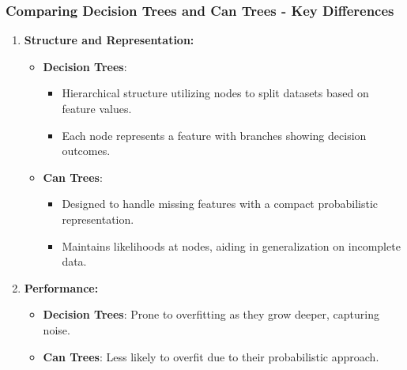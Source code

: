 \documentclass[aspectratio=169]{beamer}
\begin{document}
\begin{frame}[fragile]
    \frametitle{Comparing Decision Trees and Can Trees - Key Differences}
   
    \begin{enumerate}
        \item \textbf{Structure and Representation:}
            \begin{itemize}
                \item \textbf{Decision Trees}:
                    \begin{itemize}
                        \item Hierarchical structure utilizing nodes to split datasets based on feature values.
                        \item Each node represents a feature with branches showing decision outcomes.
                    \end{itemize}
                \item \textbf{Can Trees}:
                    \begin{itemize}
                        \item Designed to handle missing features with a compact probabilistic representation.
                        \item Maintains likelihoods at nodes, aiding in generalization on incomplete data.
                    \end{itemize}
            \end{itemize}
        \item \textbf{Performance:}
            \begin{itemize}
                \item \textbf{Decision Trees}: Prone to overfitting as they grow deeper, capturing noise.
                \item \textbf{Can Trees}: Less likely to overfit due to their probabilistic approach.
            \end{itemize}    
    \end{enumerate}    
\end{frame}
\end{document}
